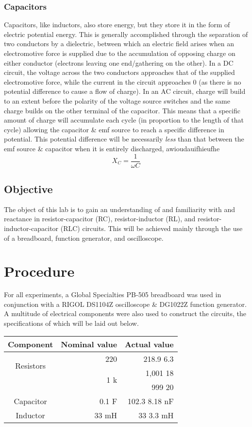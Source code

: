 \documentclass{article}
\begin{document}
			\subsubsection*{Capacitors}
				Capacitors, like inductors, also store energy, but they store it in the form of electric potential energy. This is generally accomplished through the separation of two conductors by a dielectric, between which an electric field arises when an electromotive force is supplied due to the accumulation of opposing charge on either conductor (electrons leaving one end/gathering on the other).
				In a DC circuit, the voltage across the two conductors approaches that of the supplied electromotive force, while the current in the circuit approaches 0 (as there is no potential difference to cause a flow of charge).
				In an AC circuit, charge will build to an extent before the polarity of the voltage source switches and the same charge builds on the other terminal of the capacitor. This means that a specific amount of charge will accumulate each cycle (in proportion to the length of that cycle) allowing the capacitor \& emf source to reach a specific difference in potential. This potential difference will be necessarily \emph{less} than that between the emf source \& capacitor when it is entirely discharged, awioudauifhieufhe
				$$ X_C = \frac{1}{\omega C} $$


		\subsection{Objective}
			The object of this lab is to gain an understanding of and familiarity with and reactance in resistor-capacitor (RC), resistor-inductor (RL), and resistor-inductor-capacitor (RLC) circuits. This will be achieved mainly through the use of a breadboard, function generator, and oscilloscope.

	\section{Procedure}
		For all experiments, a Global Specialties PB-505 breadboard was used in conjunction with a RIGOL DS1104Z oscilloscope \& DG1022Z function generator. A multitude of electrical components were also used to construct the circuits, the specifications of which will be laid out below.

\begin{table}[h]
	\centering
	\begin{tabular}{@{}crr@{}}
	\toprule
	Component & Nominal value & Actual value \\ \midrule
	\multirow{2}{*}{Resistors} & 220 \textOmega{} & 218.9 \textpm{} 6.3 \textOmega{} \\
							   & \multirow{2}{*}{1 k\textOmega{}}  & 1,001 \textpm{} 18 \textOmega{}    \\
							   &								 & 999 \textpm{} 20 \textOmega{}	\\
	Capacitor                  & 0.1 \textmu F  & 102.3 \textpm{} 8.18 nF \\
	Inductor  & 33 mH      & 33 \textpm{} 3.3 mH     \\ \bottomrule
	\end{tabular}
	\end{table}
\end{document}
